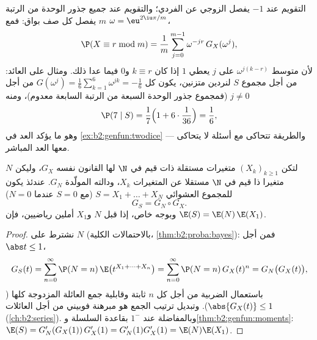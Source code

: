 \begin{remark}
التقويم عند $-1$ يفصل الزوجي عن الفردي؛ والتقويم عند جميع جذور
الوحدة من الرتبة $m$ يفصل كل صف بواق: فمع $\omega = \eu^{2\iu\pi/m}$،
\[
\P(X \equiv r \bmod m)
= \frac1m\sum_{j=0}^{m-1}\omega^{-jr}\,G_X(\omega^j),
\]
لأن متوسط $\omega^{j(k-r)}$ على $j$ يعطي $1$ إذا كان $k
\equiv r$ و$0$
فيما عدا ذلك. ومثال على العائد: من أجل مجموع $S$ لنردين متزنين،
يكون كل $G(\omega^j) = \frac16\sum_{k=1}^6
\omega^{jk} = -\frac16$ من أجل $j \neq 0$ (فمجموع جذور الوحدة السبعة من الرتبة
السابعة معدوم)، ومنه
\[
\P(7 \mid S) = \frac17\Bigl(1 +
6\cdot\frac1{36}\Bigr) = \frac16 ,
\]
وهو ما يؤكد العد في \cref{ex:b2:genfun:twodice} --- والطريقة تتحاكى مع أسئلة لا يتحاكى
معها العد المباشر.
\end{remark}

\begin{theorem}\label{thm:b2:genfun:compound}
لتكن $(X_k)_{k\geq1}$ متغيرات مستقلة ذات قيم في $\N$ لها القانون نفسه
 $G_X$، وليكن $N$ متغيرا ذا قيم في $\N$
مستقلا عن المتغيرات $X_k$، ودالته المولّدة $G_N$. عندئذ يكون
للمجموع العشوائي $S = X_1 + \dots + X_N$ (مع $S = 0$ عندما $N = 0$) 
\[
G_S = G_N \circ G_X .
\]
وبوجه خاص، إذا قبل $N$ و$X_1$ أملين رياضيين، فإن $\E(S) =
\E(N)\,\E(X_1)$.
\end{theorem}

\begin{proof}
نشترط على $N$ (بالاحتمالات الكلية، \cref{thm:b2:proba:bayes}): فمن أجل $\abs t \leq 1$،
\[
G_S(t) = \sum_{n=0}^\infty \P(N = n)\,
\E\bigl(t^{X_1 + \dots + X_n}\bigr)
= \sum_{n=0}^\infty \P(N = n)\,G_X(t)^n
= G_N\bigl(G_X(t)\bigr),
\]
باستعمال الضربية من أجل كل $n$ ثابتة وقابلية جمع العائلة المزدوجة
كلها ($\abs{G_X(t)} \leq 1$). وتبديل ترتيب الجمع هو مبرهنة فوبيني من أجل العائلات
 (\cref{ch:b2:series}). وبالمفاضلة عند $1^-$ بقاعدة السلسلة
و\cref{thm:b2:genfun:moments}: $\E(S) = G_N'(G_X(1))\,G_X'(1)
= G_N'(1)G_X'(1) = \E(N)\E(X_1)$.
\end{proof}

